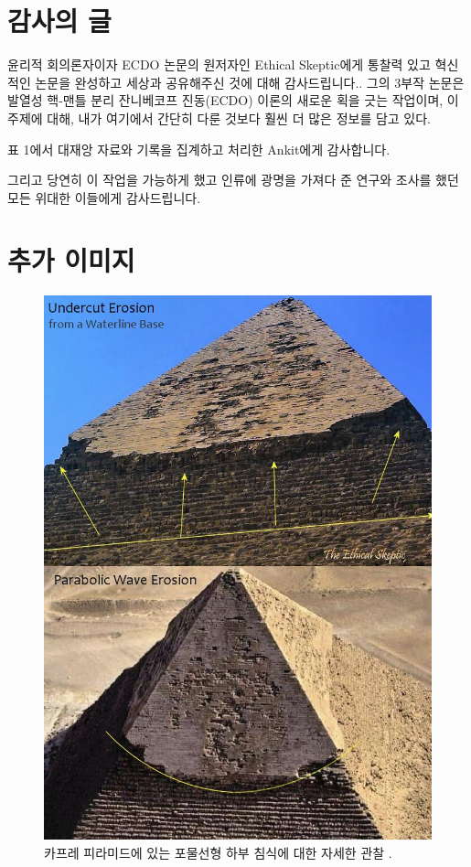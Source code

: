 \documentclass[10pt,twocolumn,letterpaper]{article}
\begin{document}
\section{감사의 글}

윤리적 회의론자이자 ECDO 논문의 원저자인 Ethical Skeptic에게 통찰력 있고 혁신적인 논문을 완성하고 세상과 공유해주신 것에 대해 감사드립니다.. 그의 3부작 논문\cite{1}은 발열성 핵-맨틀 분리 잔니베코프 진동(ECDO) 이론의 새로운 획을 긋는 작업이며, 이 주제에 대해, 내가 여기에서 간단히 다룬 것보다 훨씬 더 많은 정보를 담고 있다.

표 1에서 대재앙 자료와 기록을 집계하고 처리한 Ankit에게 감사합니다.

그리고 당연히 이 작업을 가능하게 했고 인류에 광명을 가져다 준 연구와 조사를 했던 모든 위대한 이들에게 감사드립니다.

\clearpage
\twocolumn

\section{추가 이미지}

\begin{figure}[H]
\begin{center}
   \includegraphics[width=1\linewidth]{wave.jpg}
\end{center}
   \caption{카프레 피라미드에 있는 포물선형 하부 침식에 대한 자세한 관찰 \cite{27}.}
\label{fig:17}
\label{fig:onecol}
\end{figure}
\end{document}
